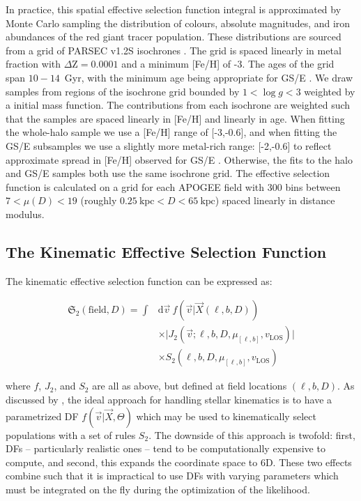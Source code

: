 In practice, this spatial effective selection function integral is approximated by Monte Carlo sampling the distribution of colours, absolute magnitudes, and iron abundances of the red giant tracer population. These distributions are sourced from a grid of PARSEC v1.2S isochrones \parencite{bressan12}. The grid is spaced linearly in metal fraction with $\Delta \mathrm{Z} = 0.0001$ and a minimum [Fe/H] of -3. The ages of the grid span $10-14$~Gyr, with the minimum age being appropriate for GS/E \parencite{montalban21}. We draw samples from regions of the isochrone grid bounded by $1 < \log g < 3$ weighted by a \textcite{chabrier03} initial mass function. The contributions from each isochrone are weighted such that the samples are spaced linearly in [Fe/H] and linearly in age. When fitting the whole-halo sample we use a [Fe/H] range of [-3,-0.6], and when fitting the GS/E subsamples we use a slightly more metal-rich range: [-2,-0.6] to reflect approximate spread in [Fe/H] observed for GS/E \parencite[see our Figure~\ref{ch3:fig:selection_abundances} or refer to e.g.][]{myeong19,hasselquist21,horta23a}. Otherwise, the fits to the halo and GS/E samples both use the same isochrone grid. The effective selection function is calculated on a grid for each APOGEE field with 300 bins between $7 < \mu(D) < 19$ (roughly $0.25~\mathrm{kpc} < D < 65~\mathrm{kpc}$) spaced linearly in distance modulus.

\subsection{The Kinematic Effective Selection Function}
\label{ch3:subsec:kinematic-effective-selection-function}

The kinematic effective selection function can be expressed as:

\begin{equation}
\label{ch3:eq:kinematic-effective-selection-function}
\begin{split}
    \mathfrak{S}_{2}(\mathrm{field},D) = \int & \mathrm{d} \vec{v}\ f(\vec{v} \vert \vec{X}(\ell, b, D)) \\
    & \times \lvert J_{2}(\vec{v}; \ell, b, D, \mu_{[\ell,b]}, v_{\mathrm{LOS}}) \rvert \\
    & \times S_{2}(\ell, b, D, \mu_{[\ell,b]}, v_{\mathrm{LOS}})
\end{split}
\end{equation}

where $f$, $J_{2}$, and $S_{2}$ are all as above, but defined at field locations $(\ell,b,D)$. As discussed by \cite{mackereth20}, the ideal approach for handling stellar kinematics is to have a parametrized DF $f(\vec{v} \vert \vec{X}, \Theta)$ which may be used to kinematically select populations with a set of rules $S_{2}$. The downside of this approach is twofold: first, DFs -- particularly realistic ones -- tend to be computationally expensive to compute, and second, this expands the coordinate space to 6D. These two effects combine such that it is impractical to use DFs with varying parameters which must be integrated on the fly during the optimization of the likelihood.

